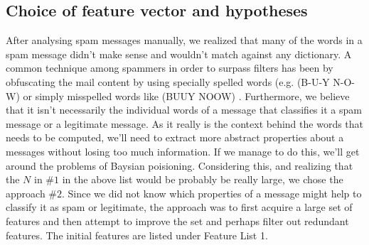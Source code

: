 \subsection{Choice of feature vector and hypotheses}
After analysing spam messages manually, we realized that many of the
words in a spam message didn't make sense and wouldn't match against any
dictionary. A common technique among spammers in order to surpass
filters has been by obfuscating the mail content by using specially spelled
words (e.g. (B-U-Y N-O-W) or simply misspelled words like (BUUY NOOW)
\cite{machine-learning-methods-spam}. Furthermore, we believe that it isn't
necessarily the individual words of a message that classifies it a spam message
or a legitimate message. As it really is the context behind the words that
needs to be computed, we'll need to extract more abstract properties about a
messages without losing too much information. If we manage to do this, we'll
get around the problems of Baysian poisioning. 
Considering this, and realizing that the $N$ in \#$1$ in the above
list would be probably be really large, we chose the approach \#$2$. Since we
did not know which properties of a message might help to classify it as spam or
legitimate, the approach was to first acquire a large set of features and then
attempt to improve the set and perhaps filter out redundant features. The
initial features are listed under Feature List 1. 

